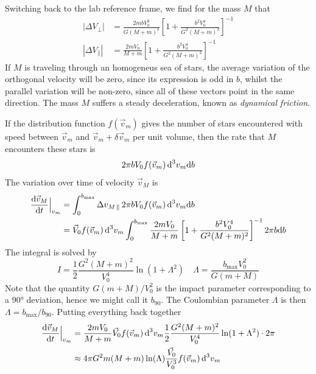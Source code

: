 Switching back to the lab reference frame, we find for the mass $M$ that 
\begin{align*}
    |\Delta V_{\perp}| &= \frac{2mbV_{0}^{3}}{G(M+m)^{2}}\left[1+\frac{b^{2}V_{0}^{4}}{G^{2}(M+m)^{2}}\right]^{-1}\\
    |\Delta V_{\parallel}| &= \frac{2mV_{0}}{M+m}\left[1+\frac{b^{2}V_{0}^{4}}{G^{2}(M+m)^{2}}\right]^{-1}
\end{align*}
If $M$ is traveling through an homogeneus sea of stars, the average variation of the orthogonal velocity will be zero, since its expression is odd in $b$, whilst the parallel variation will be non-zero, since all of these vectors point in the same direction. The mass $M$ suffers a steady deceleration, known as \emph{dynamical friction}.
\par If the distribution function $f(\vec{v}_{m})$ gives the number of stars encountered with speed between $\vec{v}_{m}$ and $\vec{v}_{m}+\delta\vec{v}_{m}$ per unit volume, then the rate that $M$ encounters these stars is
\begin{equation*}
    2\pi b V_{0}f(\vec{v}_{m})\,\text{d}^{3}v_{m}\text{d}b
\end{equation*}
The variation over time of velocity $\vec{v}_{M}$ is 
\begin{align*}
    \frac{\text{d}\vec{v}_{M}}{\text{d}t}\Big|_{v_{m}} &= \int_{0}^{b_{\text{max}}} \Delta v_{M\,\parallel}\,2\pi b V_{0}f(\vec{v}_{m})\,\text{d}^{3}v_{m}\text{d}b\\
    &=\vec{V}_{0}f(\vec{v}_{m})\,\text{d}^{3}v_{m}\int_{0}^{b_{\text{max}}}\frac{2mV_{0}}{M+m}\left[1+\frac{b^{2}V_{0}^{4}}{G^{2}(M+m)^{2}}\right]^{-1}2\pi b\text{d}b
\end{align*}
The integral is solved by 
\begin{equation*}
    I = \frac{1}{2}\frac{G^{2}(M+m)^{2}}{V_{0}^{4}}\ln(1+\Lambda^{2}) \quad \Lambda = \frac{b_{\text{max}}V_{0}^{2}}{G(m+M)}
\end{equation*}
Note that the quantity $G(m+M)/V_{0}^{2}$ is the impact parameter corresponding to a 90° deviation, hence we might call it $b_{90}$. The Coulombian parameter $\Lambda$ is then $\Lambda = b_{\text{max}}/b_{90}$. Putting everything back together
\begin{align*}
    \frac{\text{d}\vec{v}_{M}}{\text{d}t}\Big|_{v_{m}} &= \frac{2mV_{0}}{M+m}\vec{V}_{0}f(\vec{v}_{m})\,\text{d}^{3}v_{m}\frac{1}{2}\frac{G^{2}(M+m)^{2}}{V_{0}^{4}}\ln(1+\Lambda^{2})\cdot 2\pi \\
    &\approx 4\pi G^{2}m(M+m)\ln(\Lambda)\frac{\vec{V}_{0}}{V_{0}^{3}}f(\vec{v}_{m})\,\text{d}^{3}v_{m}
\end{align*}
